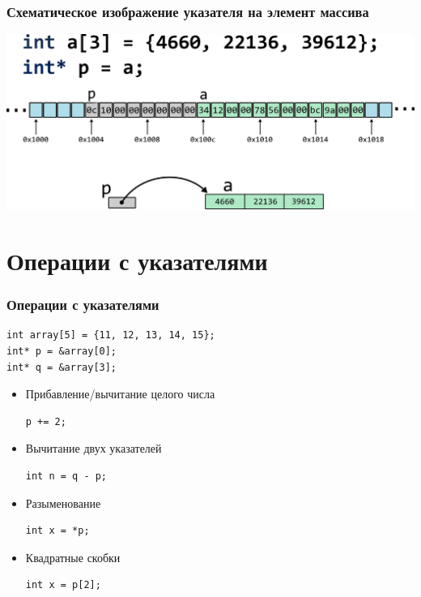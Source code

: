 \documentclass[12pt,pdf,hyperref={unicode}]{beamer}
\begin{document}
\begin{frame}[fragile]
\frametitle{Схематическое изображение указателя на элемент массива} 
\begin{center}
\includegraphics[width=0.95\linewidth]{../images/memory/memory_9_schematic_int_array.png}
\end{center}
\end{frame}


\section{Операции с указателями}

\begin{frame}[fragile]
\frametitle{Операции с указателями}
\begin{lstlisting}
int array[5] = {11, 12, 13, 14, 15};
int* p = &array[0];
int* q = &array[3];
\end{lstlisting}
\begin{itemize}
\item Прибавление/вычитание целого числа
\begin{verbatim}
p += 2;
\end{verbatim}
\item Вычитание двух указателей
\begin{verbatim}
int n = q - p;
\end{verbatim}
\item Разыменование
\begin{verbatim}
int x = *p;
\end{verbatim}
\item Квадратные скобки
\begin{verbatim}
int x = p[2];
\end{verbatim}
\end{itemize}
\end{frame}
\end{document}
